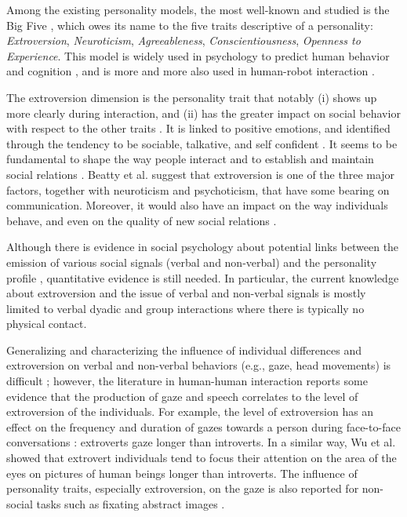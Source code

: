 \documentclass[twocolumn]{svjour3}          %
\begin{document}
Among the existing personality models, the most well-known and studied is the Big Five \cite{NEOPIR1998}, which owes its name to the five traits descriptive of a personality: \emph{Extroversion}, \emph{Neuroticism}, \emph{Agreeableness}, \emph{Conscientiousness}, \emph{Openness to Experience}. This model is widely used in psychology to predict human behavior and cognition \cite{Wu2014,Rauthmann2012}, and is more and more also used in human-robot interaction \cite{Tapus08,Takayama2009proxemics}.


The extroversion dimension is the personality trait that notably (i) shows up more clearly during interaction, and (ii) has the greater impact on social behavior with respect to the other traits \cite{Zen2010}. It is linked to positive emotions, and identified through the tendency to be sociable, talkative, and self confident \cite{NEOPIR1998}. 
It seems to be fundamental to shape the way people interact \cite{Eysenck1981} and to establish and maintain social relations \cite{Wu2014}.
Beatty et al. \cite{Beatty2001} suggest that extroversion is one of the three major factors, together with neuroticism and psychoticism, that have some bearing on communication.  Moreover, it would also have an impact on the way individuals behave, and even on the quality of new social relations \cite{Berry2000}.

Although there is evidence in social psychology about potential links between the emission of various social signals (verbal and non-verbal) and the personality profile \cite{Argyle1976}, quantitative evidence is still needed. 
In particular, the current knowledge about extroversion and the issue of verbal and non-verbal signals is mostly limited to verbal dyadic and group interactions where there is typically no physical contact. 

Generalizing and characterizing the influence of individual differences and extroversion on verbal and non-verbal behaviors (e.g., gaze, head movements) is difficult \cite{LaFrance2004}; however, the literature in human-human interaction reports some evidence that the production of gaze and speech correlates to the level of extroversion of the individuals. 
For example, the level of extroversion has an effect on the frequency and duration of gazes towards a person during face-to-face conversations \cite{Iizuka1992}: extroverts gaze longer than introverts.
In a similar way, Wu et al. \cite{Wu2014} showed that extrovert individuals tend to focus their attention on the area of the eyes on pictures of human beings longer than introverts. 
The influence of personality traits, especially extroversion, on the gaze is also reported for non-social tasks such as fixating abstract images \cite{Rauthmann2012}. 
\end{document}
